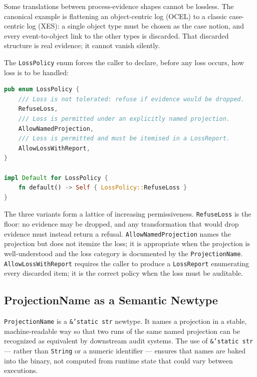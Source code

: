 Some translations between process-evidence shapes cannot be lossless. The
canonical example is flattening an object-centric log (OCEL) to a classic
case-centric log (XES): a single object type must be chosen as the case notion,
and every event-to-object link to the other types is discarded. That discarded
structure is real evidence; it cannot vanish silently.

The \texttt{LossPolicy} enum forces the caller to declare, before any loss
occurs, how loss is to be handled:

\begin{lstlisting}[language=Rust, caption={\texttt{LossPolicy}: a pre-loss
  declaration. The default (via \texttt{Default::default()}) is
  \texttt{RefuseLoss} --- the safest option.}, label={lst:losspolicy}]
pub enum LossPolicy {
    /// Loss is not tolerated: refuse if evidence would be dropped.
    RefuseLoss,
    /// Loss is permitted under an explicitly named projection.
    AllowNamedProjection,
    /// Loss is permitted and must be itemised in a LossReport.
    AllowLossWithReport,
}

impl Default for LossPolicy {
    fn default() -> Self { LossPolicy::RefuseLoss }
}
\end{lstlisting}

The three variants form a lattice of increasing permissiveness.
\texttt{RefuseLoss} is the floor: no evidence may be dropped, and any
transformation that would drop evidence must instead return a refusal.
\texttt{AllowNamedProjection} names the projection but does not itemize the
loss; it is appropriate when the projection is well-understood and the loss
category is documented by the \texttt{ProjectionName}. \texttt{AllowLossWithReport}
requires the caller to produce a \texttt{LossReport} enumerating every
discarded item; it is the correct policy when the loss must be auditable.

\subsection{ProjectionName as a Semantic Newtype}

\texttt{ProjectionName} is a \texttt{\&'static str} newtype. It names a
projection in a stable, machine-readable way so that two runs of the same
named projection can be recognized as equivalent by downstream audit systems.
The use of \texttt{\&'static str} --- rather than \texttt{String} or a numeric
identifier --- ensures that names are baked into the binary, not computed from
runtime state that could vary between executions.

